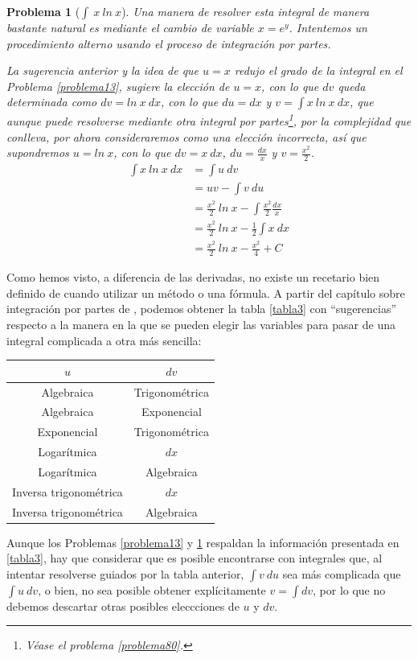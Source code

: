\documentclass[paper=a4, fontsize=11pt]{scrartcl}
\numberwithin{equation}{subsection}
\numberwithin{figure}{subsection}
\numberwithin{table}{subsection}
\newtheorem{problema}{Problema}
\theoremstyle{definition}
\begin{document}
\begin{problema}[$\int\:x\:ln\:x$]\label{problema14}
	Una manera de resolver esta integral de manera bastante natural es mediante el cambio de variable $x=e^y$. Intentemos un procedimiento alterno usando el proceso de integración por partes.
	
	La sugerencia anterior y la idea de que $u=x$ redujo el grado de la integral en el Problema \ref{problema13}, sugiere la elección de $u=x$, con lo que $dv$ queda determinada como $dv=ln\:x\:dx$, con lo que $du=dx$ y $v=\int x\:ln\:x\:dx$, que aunque puede resolverse mediante otra integral por partes\footnote{Véase el problema \ref{problema80}.}, por la complejidad que conlleva, por ahora consideraremos como una elección incorrecta, así que supondremos $u=ln\:x$, con lo que $dv=x\:dx$, $du=\frac{dx}{x}$ y $v=\frac{x^2}{2}$.
	\begin{align*}
		\int x\:ln\:x\:dx&=\int u\:dv\\
					&=uv-\int v\:du\\
					&=\frac{x^2}{2}\:ln\:x-\int \frac{x^2}{2}\frac{dx}{x}\\
					&=\frac{x^2}{2}\:ln\:x-\frac{1}{2}\int x\:dx\\
					&=\frac{x^2}{2}\:ln\:x-\frac{x^2}{4}+C
	\end{align*}
\end{problema}

Como hemos visto, a diferencia de las derivadas, no existe un recetario bien definido de cuando utilizar un método o una fórmula. A partir del capítulo sobre integración por partes de \cite{simplificadas}, podemos obtener la tabla \ref{tabla3} con ``sugerencias'' respecto a la manera en la que se pueden elegir las variables para pasar de una integral complicada a otra más sencilla:
\begin{center}
	\begin{tabular}{|c|c|}
		\hline
		$u$&$dv$\\
		\hline
		Algebraica&Trigonométrica\\
		Algebraica&Exponencial\\
		Exponencial&Trigonométrica\\
		Logarítmica&$dx$\\
		Logarítmica&Algebraica\\
		Inversa trigonométrica&$dx$\\
		Inversa trigonométrica&Algebraica\\
		\hline
	\end{tabular}\label{tabla3}
\end{center}
Aunque los Problemas \ref{problema13} y \ref{problema14} respaldan la información presentada en \ref{tabla3}, hay que considerar que es posible encontrarse con integrales que, al intentar resolverse guiados por la tabla anterior, $\int v \:du$ sea más complicada que $\int u\:dv$, o bien, no sea posible obtener explícitamente $v=\int dv$, por lo que no debemos descartar otras posibles eleccciones de $u$ y $dv$.
\end{document}
